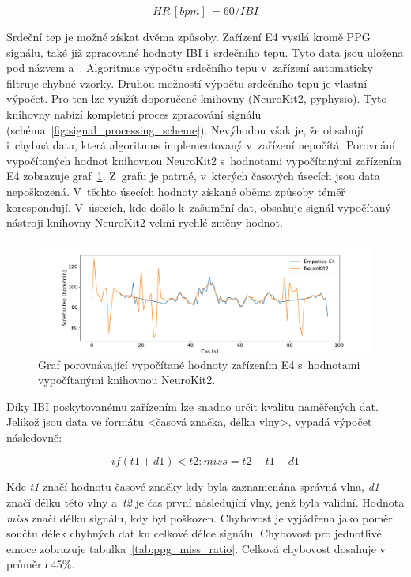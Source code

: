     \begin{equation} 
        HR\,[bpm]\,= {60 / IBI}
        \label{eq:ibi_to_hr}
    \end{equation}
    
    Srdeční tep je možné získat dvěma způsoby. Zařízení E4 vysílá kromě PPG signálu, také již zpracované hodnoty IBI i~srdečního tepu. Tyto data jsou uložena pod názvem  a~. Algoritmus výpočtu srdečního tepu v~zařízení automaticky filtruje chybné vzorky. Druhou možností výpočtu srdečního tepu je vlastní výpočet. Pro ten lze využít doporučené knihovny (NeuroKit2, pyphysio). Tyto knihovny nabízí kompletní proces zpracování signálu (schéma~\ref{fig:signal_processing_scheme}). Nevýhodou však je, že obsahují i~chybná data, která algoritmus implementovaný v~zařízení nepočítá. Porovnání vypočítaných hodnot knihovnou NeuroKit2 s~hodnotami vypočítanými zařízením E4 zobrazuje graf~\ref{fig:e4_vs_nk_good}. Z~grafu je patrné, v~kterých časových úsecích jsou data nepoškozená. V~těchto úsecích hodnoty získané oběma způsoby téměř korespondují. V~úsecích, kde došlo k~zašumění dat, obsahuje signál vypočítaný nástroji knihovny NeuroKit2 velmi rychlé změny hodnot.
    
    \begin{figure}[H]
        \centering
        \includegraphics[width=\textwidth]{obrazky-figures/e4_vs_nk_good.png}
        \caption{Graf porovnávající vypočítané hodnoty zařízením E4 s~hodnotami vypočítanými knihovnou NeuroKit2.}
        \label{fig:e4_vs_nk_good}
    \end{figure}
    
    Díky IBI poskytovanému zařízením lze snadno určit kvalitu naměřených dat. Jelikož jsou data ve formátu <časová značka, délka vlny>, vypadá výpočet následovně: 
    
    \begin{equation} 
        if (t1 + d1) < t2:
            miss = t2 - t1 - d1
        \label{eq:miss_ratio}
    \end{equation}
    
    Kde \emph{t1} značí hodnotu časové značky kdy byla zaznamenána správná vlna, \emph{d1} značí délku této vlny a~\emph{t2} je čas první následující vlny, jenž byla validní. Hodnota \emph{miss} značí délku signálu, kdy byl poškozen. Chybovost je vyjádřena jako poměr součtu délek chybných dat ku celkové délce signálu. Chybovost pro jednotlivé emoce zobrazuje tabulka~\ref{tab:ppg_miss_ratio}. Celková chybovost dosahuje v průměru 45\%.
    

